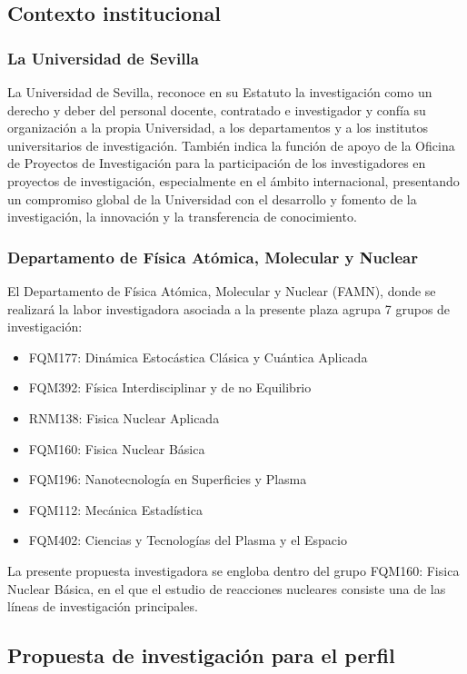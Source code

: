 \documentclass[a4paper,12pt,twoside]{article}
\begin{document}
\subsection{Contexto institucional}


\subsubsection{La Universidad de Sevilla}
La Universidad de Sevilla, reconoce en su Estatuto \cite{estatutos} la investigación como un derecho y deber del personal docente, contratado e investigador y confía su organización a la propia Universidad, a los departamentos y a los institutos universitarios de investigación. También indica la función de apoyo de la Oficina de Proyectos de Investigación para la participación de los investigadores en proyectos de investigación, especialmente en el ámbito internacional, presentando un compromiso global de la Universidad con el desarrollo y fomento de la investigación, la innovación y la transferencia de conocimiento.

\subsubsection{Departamento de Física Atómica, Molecular y Nuclear}

El Departamento de Física Atómica, Molecular y Nuclear (FAMN), donde se realizará la labor investigadora asociada a la presente plaza agrupa 7 grupos de investigación:

\begin{itemize}
\item FQM177: Dinámica Estocástica Clásica y Cuántica Aplicada
\item FQM392: Física Interdisciplinar y de no Equilibrio
\item RNM138: Fisica Nuclear Aplicada
\item FQM160: Fisica Nuclear Básica
\item FQM196: Nanotecnología en Superficies y Plasma
\item FQM112: Mecánica Estadística
\item FQM402: Ciencias y Tecnologías del Plasma y el Espacio
\end{itemize}

La presente propuesta investigadora se engloba dentro del grupo FQM160: Fisica Nuclear Básica, en el que el estudio de reacciones nucleares consiste una de las líneas de investigación principales.

\subsection{Propuesta de investigación para el perfil}
\end{document}

